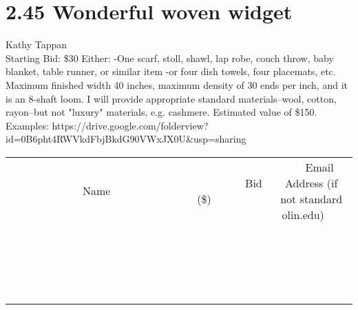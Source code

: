 \documentclass[11pt]{article}
\begin{document}
\section*{2.45 Wonderful woven widget}
Kathy Tappan
\\
Starting Bid: \$30
\newline
Either:
-One scarf, stoll, shawl, lap robe, couch throw, baby blanket, table runner, or similar item
-or four dish towels, four placemats, etc.
Maximum finished width 40 inches, maximum density of 30 ends per inch, and it is an 8-shaft loom.  I will provide appropriate standard materials--wool, cotton, rayon--but not "luxury" materials, e.g. cashmere. Estimated value of \$150. Examples: https://drive.google.com/folderview?id=0B6pht4RWVkdFbjBkdG90VWxJX0U\&usp=sharing
\\[3ex]
\begin{tabular}{c c c}
~~~~~~~~~~~~~Name~~~~~~~~~~~~~ & ~~~~~~~~~Bid (\$)~~~~~~~~~  & ~~~Email Address (if not standard olin.edu)~~~\\
 & & \\
\hline
 & & \\
\hline
 & & \\
\hline
 & & \\
\hline
 & & \\
\hline
 & & \\
\hline
 & & \\
\hline
 & & \\
\hline
 & & \\
\hline
 & & \\
\hline
 & & \\
\hline
 & & \\
\hline
 & & \\
\hline
 & & \\
\hline
 & & \\
\hline
 & & \\
\hline
 & & \\
\hline
 & & \\
\hline
 & & \\
\hline
\end{tabular}
\newpage
\end{document}
